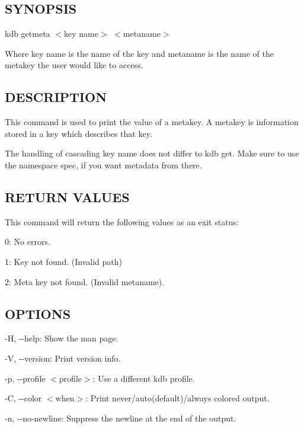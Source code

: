 \subsection*{S\+Y\+N\+O\+P\+S\+IS}

{\ttfamily kdb getmeta $<$key name$>$ $<$metaname$>$}~\newline


Where {\ttfamily key name} is the name of the key and {\ttfamily metaname} is the name of the metakey the user would like to access.

\subsection*{D\+E\+S\+C\+R\+I\+P\+T\+I\+ON}

This command is used to print the value of a metakey. A metakey is information stored in a key which describes that key.

The handling of cascading {\ttfamily key name} does not differ to {\ttfamily kdb get}. Make sure to use the namespace {\ttfamily spec}, if you want metadata from there.

\subsection*{R\+E\+T\+U\+RN V\+A\+L\+U\+ES}

This command will return the following values as an exit status\+:~\newline



\begin{DoxyItemize}
\item 0\+: No errors.
\item 1\+: Key not found. (Invalid {\ttfamily path})
\item 2\+: Meta key not found. (Invalid {\ttfamily metaname}).
\end{DoxyItemize}

\subsection*{O\+P\+T\+I\+O\+NS}


\begin{DoxyItemize}
\item {\ttfamily -\/H}, {\ttfamily -\/-\/help}\+: Show the man page.
\item {\ttfamily -\/V}, {\ttfamily -\/-\/version}\+: Print version info.
\item {\ttfamily -\/p}, {\ttfamily -\/-\/profile $<$profile$>$}\+: Use a different kdb profile.
\item {\ttfamily -\/C}, {\ttfamily -\/-\/color $<$when$>$}\+: Print never/auto(default)/always colored output.
\item {\ttfamily -\/n}, {\ttfamily -\/-\/no-\/newline}\+: Suppress the newline at the end of the output.
\end{DoxyItemize}

